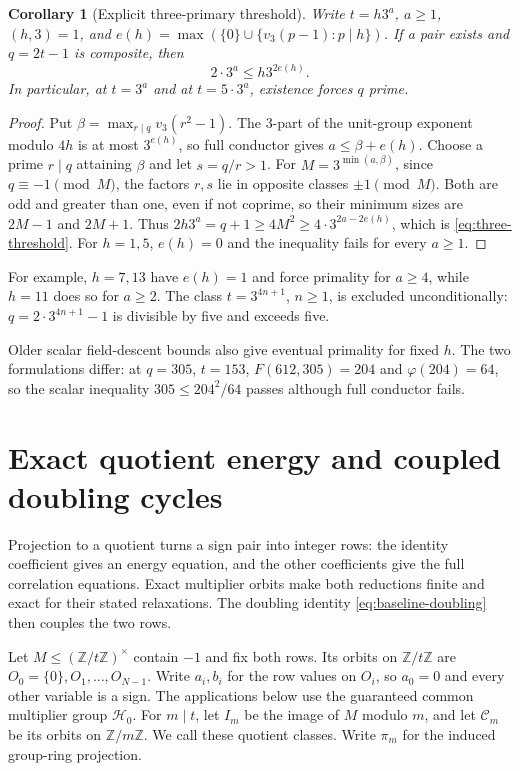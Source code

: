 \documentclass[11pt]{article}
\newtheorem{corollary}[theorem]{Corollary}
\theoremstyle{definition}
\theoremstyle{remark}
\begin{document}
\begin{corollary}[Explicit three-primary threshold]\label{cor:three}
Write $t=h3^a$, $a\ge1$, $(h,3)=1$, and
$e(h)=\max(\{0\}\cup\{v_3(p-1):p\mid h\})$. If a pair exists and
$q=2t-1$ is composite, then
\begin{equation}\label{eq:three-threshold}
 2\cdot3^a\le h3^{2e(h)}.
\end{equation}
In particular, at $t=3^a$ and at $t=5\cdot3^a$, existence forces $q$ prime.
\end{corollary}
\begin{proof}
Put $\beta=\max_{r\mid q}v_3(r^2-1)$. The 3-part of the unit-group
exponent modulo $4h$ is at most $3^{e(h)}$, so full conductor gives
$a\le\beta+e(h)$. Choose a prime $r\mid q$ attaining $\beta$ and let
$s=q/r>1$. For $M=3^{\min(a,\beta)}$, since $q\equiv-1\pmod M$, the
factors $r,s$ lie in opposite classes $\pm1\pmod M$. Both are odd and
greater than one, even if not coprime, so their minimum sizes are $2M-1$
and $2M+1$. Thus $2h3^a=q+1\ge4M^2\ge4\cdot3^{2a-2e(h)}$, which is
\eqref{eq:three-threshold}. For $h=1,5$, $e(h)=0$ and the inequality
fails for every $a\ge1$.
\end{proof}
For example, $h=7,13$ have
$e(h)=1$ and force primality for $a\ge4$, while $h=11$ does so for
$a\ge2$. The class $t=3^{4n+1}$, $n\ge1$, is excluded unconditionally:
$q=2\cdot3^{4n+1}-1$ is divisible by five and exceeds five.

Older scalar field-descent bounds also give eventual primality for fixed
$h$. The two formulations differ: at $q=305$, $t=153$, $F(612,305)=204$
and $\varphi(204)=64$, so the scalar inequality $305\le204^2/64$ passes
although full conductor fails.

\section{Exact quotient energy and coupled doubling cycles}
\label{se-sec-quotients}

Projection to a quotient turns a sign pair into integer rows: the
identity coefficient gives an energy equation, and the other
coefficients give the full correlation equations.  Exact multiplier
orbits make both reductions finite and exact for their stated
relaxations.  The doubling identity \eqref{eq:baseline-doubling} then
couples the two rows.

Let $M\leq (\mathbb Z/t\mathbb Z)^\times$ contain $-1$ and fix both
rows.  Its orbits on $\mathbb Z/t\mathbb Z$ are
$O_0=\{0\},O_1,\ldots,O_{N-1}$.  Write $a_i,b_i$ for the row values on
$O_i$, so $a_0=0$ and every other variable is a sign.  The applications
below use the guaranteed common multiplier group $\mathcal H_0$.
For $m\mid t$, let $I_m$ be the image of $M$ modulo $m$, and let
$\mathcal C_m$ be its orbits on $\mathbb Z/m\mathbb Z$.  We call these
quotient classes.  Write $\pi_m$ for the induced group-ring projection.
\end{document}

